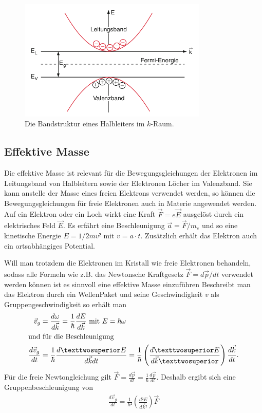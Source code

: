 \begin{figure}
	\centering
	\includegraphics[width=0.8\textwidth]{./Bilder/bandstrukt.png}
	\caption{Die Bandstruktur eines Halbleiters im $k$-Raum\cite{book:expi3}.}\label{fig:band}
\end{figure}

\subsection{Effektive Masse \cite[][Kap. 14]{book:expi3}}

Die effektive Masse ist relevant für die Bewegungsgleichungen der Elektronen im
Leitungsband von Halbleitern sowie der Elektronen Löcher im Valenzband. Sie
kann anstelle der Masse eines freien Elektrons verwendet werden, so können die
Bewegungsgleichungen für freie Elektronen auch in Materie angewendet werden.
Auf ein Elektron oder ein Loch wirkt eine Kraft $\vec{F} = e \vec{E}$ ausgelöst
durch ein elektrisches Feld $\vec{E}$. Es erfährt eine Beschleunigung $\vec{a}
	= \vec{F}/m_e$ und so eine kinetische Energie $E = 1/2 m v²$ mit $v= a\cdot t$.
Zusätzlich erhält das Elektron auch ein ortsabhängiges Potential.

Will man trotzdem die Elektronen im Kristall wie freie Elektronen behandeln,
sodass alle Formeln wie z.B. das Newtonsche Kraftgesetz $\vec{F} = d\vec{p}/dt$
verwendet werden können ist es sinnvoll eine effektive Masse einzuführen
Beschreibt man das Elektron durch ein WellenPaket und seine Geschwindigkeit $v$
als Gruppengeschwindigkeit so erhält man
\begin{align}
	\vec{v}_g             & = \frac{d\omega}{d\vec{k}} = \frac{1}{\hbar} \frac{dE}{d\vec{k}} \t{ mit } E = \hbar \omega                        \\
	\intertext{und für die Beschleunigung}
	\frac{d\vec{v}_g}{dt} & = \frac{1}{\hbar} \frac{d²E}{d\vec{k} dt} = \frac{1}{\hbar} \left(\frac{d²E}{d\vec{k}²}\right)\frac{d\vec{k}}{dt}.
\end{align}
Für die freie Newtongleichung gilt $\vec{F} = \frac{d\vec{p}}{dt} =\frac{1}{\hbar}\frac{d\vec{p}}{dt} $.
Deshalb ergibt sich eine Gruppenbeschleunigung von
\begin{align}
	\frac{d\vec{v}_g}{dt} = \frac{1}{\hbar²} \left(\frac{d²E}{d\vec{k}²}\right) \vec{F}
\end{align}

